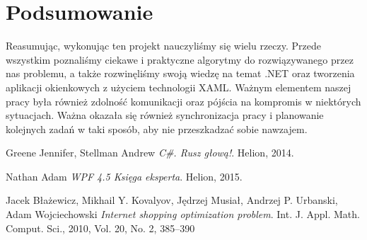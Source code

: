 \documentclass[a4paper]{article}
\let\oldsection\section
\renewcommand\section{\clearpage\oldsection}
\begin{document}
\section{Podsumowanie}
Reasumując, wykonując ten projekt nauczyliśmy się wielu rzeczy. Przede wszystkim poznaliśmy ciekawe i praktyczne algorytmy do rozwiązywanego przez nas problemu, a także rozwinęliśmy swoją wiedzę na temat .NET oraz tworzenia aplikacji okienkowych z użyciem technologii XAML. Ważnym elementem naszej pracy była również zdolność komunikacji oraz pójścia na kompromis w niektórych sytuacjach. Ważna okazała się również synchronizacja pracy i planowanie kolejnych zadań w taki sposób, aby nie przeszkadzać sobie nawzajem.
\begin{thebibliography}{9}

  Greene Jennifer, Stellman Andrew 
  \emph{C\#. Rusz głową!}.
  Helion,
  2014.
  
	Nathan Adam
	\emph{WPF 4.5 Księga eksperta}. Helion, 2015.  
  
	Jacek Błażewicz, Mikhail Y. Kovalyov, Jędrzej Musiał, Andrzej P. Urbanski, Adam Wojciechowski
	\emph{Internet shopping optimization problem}.
	Int. J. Appl. Math. Comput. Sci., 2010, Vol. 20, No. 2, 385–390 
	
  \end{thebibliography}
\end{document}
